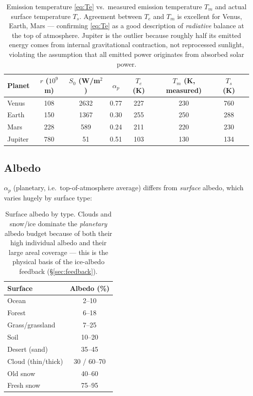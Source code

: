 \documentclass[11pt]{article}
\begin{document}
\begin{table}[h!]
\centering
\begin{tabular}{@{}lccccccc@{}}
\toprule
Planet & $r$ ($10^9$m) & $S_0$ (W/m$^2$) & $\alpha_p$ & $T_e$ (K) & $T_m$ (K, measured) & $T_s$ (K) \\
\midrule
Venus & 108 & 2632 & 0.77 & 227 & 230 & 760 \\
Earth & 150 & 1367 & 0.30 & 255 & 250 & 288 \\
Mars & 228 & 589 & 0.24 & 211 & 220 & 230 \\
Jupiter & 780 & 51 & 0.51 & 103 & 130 & 134 \\
\bottomrule
\end{tabular}
\caption{Emission temperature \eqref{eq:Te} vs.\ measured emission temperature $T_m$ and actual surface temperature $T_s$. Agreement between $T_e$ and $T_m$ is excellent for Venus, Earth, Mars — confirming \eqref{eq:Te} as a good description of \emph{radiative} balance at the top of atmosphere. Jupiter is the outlier because roughly half its emitted energy comes from internal gravitational contraction, not reprocessed sunlight, violating the assumption that all emitted power originates from absorbed solar power.}
\end{table}

\subsection{Albedo}
$\alpha_p$ (planetary, i.e.\ top-of-atmosphere average) differs from \emph{surface} albedo, which varies hugely by surface type:

\begin{table}[h!]
\centering
\begin{tabular}{@{}lc@{}}
\toprule
Surface & Albedo (\%) \\
\midrule
Ocean & 2--10 \\
Forest & 6--18 \\
Grass/grassland & 7--25 \\
Soil & 10--20 \\
Desert (sand) & 35--45 \\
Cloud (thin/thick) & 30 / 60--70 \\
Old snow & 40--60 \\
Fresh snow & 75--95 \\
\bottomrule
\end{tabular}
\caption{Surface albedo by type. Clouds and snow/ice dominate the \emph{planetary} albedo budget because of both their high individual albedo and their large areal coverage — this is the physical basis of the ice-albedo feedback (\S\ref{sec:feedback}).}
\end{table}
\end{document}
